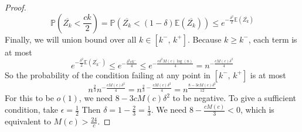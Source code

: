 \documentclass{amsart}
\theoremstyle{plain}
\theoremstyle{definition}
\begin{document}
\begin{proof}
    \begin{equation}
        \mathbb{P}\left(\overline{Z_k} < \frac{ck}{2}\right) =
        \mathbb{P}\left(\overline{Z_k} < (1 - \delta)\mathbb{E}(\overline{Z_k})\right) \leq
        e^{-\frac{\delta^2}{2}\mathbb{E}(\overline{Z_k})}
        \label{eq:chernoff}
    \end{equation}
    \noindent Finally, we will union bound over all $k \in [k^{-}, \, k^{+}]$.
    Because $k \geq k^-$, each term is at most
    \begin{equation}
        e^{-\frac{\delta^2}{2}\mathbb{E}(\overline{Z_{k^-}})} \leq
        e^{-\frac{\delta^2ck^-}{4}} \leq
        e^{-\frac{c\delta^2M(c)\log(n)}{4}} =
        n^{-\frac{cM(c)\delta^2}{4}}
        \label{eq:logbound}
    \end{equation}
    So the probability of the condition failing at any point in $[k^{-}, \, k^{+}]$ is at most
    \begin{equation}
        n^{\frac{2}{3}}n^{-\frac{cM(c)\delta^2}{4}} = n^{\frac{2}{3} - \frac{cM(c)\delta^2}{4}} =
        n^{\frac{8 - 3cM(c)\delta^2}{12}}
        \label{eq:finalbound}
    \end{equation}
    \noindent For this to be $o(1)$, we need $8 - 3cM(c)\delta^2$ to be negative.
    To give a sufficient condition, take $\epsilon = \frac{1}{2}$ Then $\delta =  1 - \frac{2}{3} = \frac{1}{3}$.
    We need $8 - \frac{cM(c)}{3} < 0$, which is equivalent to $M(c) > \frac{24}{c}$.
    \end{proof}
\end{document}
